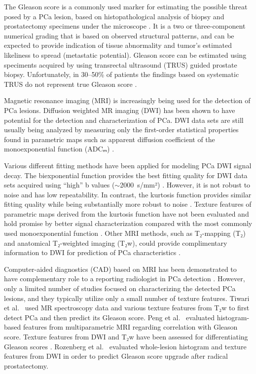 \documentclass[10pt,letterpaper]{article}
\newcommand{\citep}{\cite}
\begin{document}
The Gleason score is a commonly used marker for estimating the possible threat
posed by a PCa lesion, based on histopathological analysis of biopsy and
prostatectomy specimens under the microscope \citep{Epstein2005}. It is a two or
three-component numerical grading that is based on observed structural patterns,
and can be expected to provide indication of tissue abnormality and tumor's
estimated likeliness to spread (metastatic potential). Gleason score can be
estimated using speciments acquired by using transrectal ultrasound (TRUS)
guided prostate biopsy. Unfortunately, in 30--50\% of patients the findings
based on systematic TRUS do not represent true Gleason score \citep{Nepple2009,
Steinberg1997, Rajinikanth2008}.

Magnetic resonance imaging (MRI) is increasingly being used for the detection of
PCa lesions. Diffusion weighted MR imaging (DWI) has been shown to have
potential for the detection and characterization of PCa. DWI data sets are
still usually being analyzed by measuring only the first-order statistical
properties found in parametric maps such as apparent diffusion coefficient of
the monoexponential function (ADCₘ) \citep{Turkbey2011, Toivonen2015,
Jambor2015Relaxation}.

Various different fitting methods have been applied for modeling PCa DWI signal
decay. The biexponential function \citep{Mulkern2006} provides the best fitting
quality for DWI data sets acquired using ``high'' b values ($\sim$2000~s/mm²)
\citep{Jambor2015Evaluation}. However, it is not robust to noise and has low
repeatability. In contrast, the kurtosis function \citep{Jensen2005} provides
similar fitting quality while being substantially more robust to noise
\citep{Jambor2015Evaluation}. Texture features of parametric maps derived from
the kurtosis function have not been evaluated and hold promise by better signal
characterization compared with the most commonly used monoexponential function
\citep{Toivonen2015}. Other MRI methods, such as T₂-mapping (T₂) and anatomical
T₂-weighted imaging (T₂w), could provide complimentary information to DWI for
prediction of PCa characteristics \citep{Jambor2015Relaxation}.

Computer-aided diagnostics (CAD) based on MRI has been demonstrated to have
complementary role to a reporting radiologist in PCa detection \citep{Kwak2015,
Viswanath2012, Ginsburg2014}. However, only a limited number of studies focused
on characterizing the detected PCa lesions, and they typically utilize only a
small number of texture features. Tiwari et al.\ \cite{Tiwari2013} used MR
spectroscopy data and various texture features from T₂w to first detect PCa and
then predict its Gleason score. Peng et al.\ \cite{Peng2013} evaluated
histogram-based features from multiparametric MRI regarding correlation with
Gleason score. Texture features from DWI and T₂w have been assessed for
differentiating Gleason scores \citep{Wibmer2015, Vignati2015, Fehr2015}.
Rozenberg et al.\ \cite{Rozenberg2016} evaluated whole-lesion histogram and
texture features from DWI in order to predict Gleason score upgrade after
radical prostatectomy.
\end{document}
